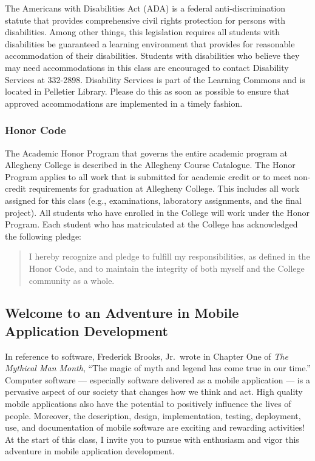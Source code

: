 The Americans with Disabilities Act (ADA) is a federal anti-discrimination statute that provides comprehensive civil
rights protection for persons with disabilities.  Among other things, this legislation requires all students with
disabilities be guaranteed a learning environment that provides for reasonable accommodation of their disabilities.
Students with disabilities who believe they may need accommodations in this class are encouraged to contact Disability
Services at 332-2898.  Disability Services is part of the Learning Commons and is located in Pelletier Library.
Please do this as soon as possible to ensure that approved accommodations are implemented in a timely fashion.

\subsubsection*{Honor Code}

The Academic Honor Program that governs the entire academic program at Allegheny College is described in the Allegheny
Course Catalogue.  The Honor Program applies to all work that is submitted for academic credit or to meet non-credit
requirements for graduation at Allegheny College.  This includes all work assigned for this class (e.g., examinations,
laboratory assignments, and the final project).  All students who have enrolled in the College will work under the Honor
Program.  Each student who has matriculated at the College has acknowledged the following pledge:

\vspace*{-.1in}
\begin{quote}
I hereby recognize and pledge to fulfill my responsibilities, as defined in the Honor Code, and to maintain the
integrity of both myself and the College community as a whole.  
\end{quote}
\vspace*{-.15in}

\subsection*{Welcome to an Adventure in Mobile Application Development}

In reference to software, Frederick Brooks, Jr.\ wrote in Chapter One of {\em The Mythical Man Month}, ``The magic of
myth and legend has come true in our time.'' Computer software --- especially software delivered as a mobile application
--- is a pervasive aspect of our society that changes how we think and act.  High quality mobile applications also have
the potential to positively influence the lives of people. Moreover, the description, design, implementation, testing,
deployment, use, and documentation of mobile software are exciting and rewarding activities!  At the start of this class, I
invite you to pursue with enthusiasm and vigor this adventure in mobile application development.


